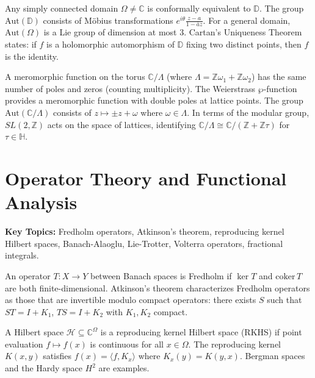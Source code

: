 \begin{example}
Any simply connected domain $\Omega \neq \mathbb{C}$ is conformally equivalent to $\mathbb{D}$. The group $\mathrm{Aut}(\mathbb{D})$ consists of Möbius transformations $e^{i\theta}\frac{z-a}{1-\bar{a}z}$. For a general domain, $\mathrm{Aut}(\Omega)$ is a Lie group of dimension at most 3. Cartan's Uniqueness Theorem states: if $f$ is a holomorphic automorphism of $\mathbb{D}$ fixing two distinct points, then $f$ is the identity.
\end{example}

\begin{example}
A meromorphic function on the torus $\mathbb{C}/\Lambda$ (where $\Lambda = \mathbb{Z}\omega_1 + \mathbb{Z}\omega_2$) has the same number of poles and zeros (counting multiplicity). The Weierstrass $\wp$-function provides a meromorphic function with double poles at lattice points. The group $\mathrm{Aut}(\mathbb{C}/\Lambda)$ consists of $z \mapsto \pm z + \omega$ where $\omega \in \Lambda$. In terms of the modular group, $SL(2,\mathbb{Z})$ acts on the space of lattices, identifying $\mathbb{C}/\Lambda \cong \mathbb{C}/(\mathbb{Z} + \mathbb{Z}\tau)$ for $\tau \in \mathbb{H}$.
\end{example}

\section{Operator Theory and Functional Analysis}

\textbf{Key Topics:} Fredholm operators, Atkinson's theorem, reproducing kernel Hilbert spaces, Banach-Alaoglu, Lie-Trotter, Volterra operators, fractional integrals.

\begin{example}
An operator $T: X \to Y$ between Banach spaces is Fredholm if $\ker T$ and $\mathrm{coker}\,T$ are both finite-dimensional. Atkinson's theorem characterizes Fredholm operators as those that are invertible modulo compact operators: there exists $S$ such that $ST = I + K_1$, $TS = I + K_2$ with $K_1, K_2$ compact.
\end{example}

\begin{example}
A Hilbert space $\mathcal{H} \subseteq \mathbb{C}^\Omega$ is a reproducing kernel Hilbert space (RKHS) if point evaluation $f \mapsto f(x)$ is continuous for all $x \in \Omega$. The reproducing kernel $K(x,y)$ satisfies $f(x) = \langle f, K_x \rangle$ where $K_x(y) = K(y,x)$. Bergman spaces and the Hardy space $H^2$ are examples.
\end{example}

